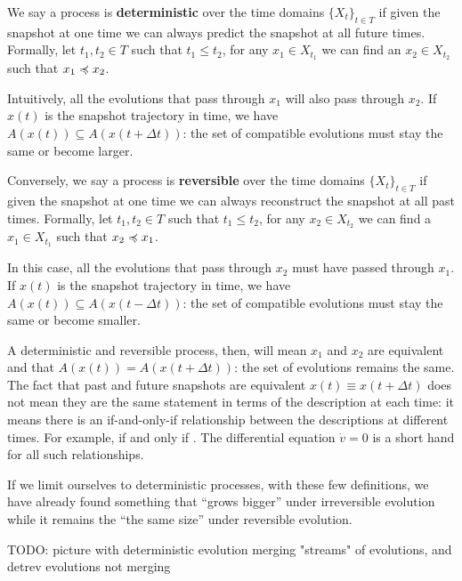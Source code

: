 \documentclass[letterpaper]{article}
\begin{document}
We say a process is \textbf{deterministic} over the time domains $\{X_t\}_{t \in T}$ if given the snapshot at one time we can always predict the snapshot at all future times. Formally, let $t_1, t_2 \in T$ such that $t_1 \leq t_2$, for any $x_1 \in X_{t_1}$ we can find an $x_2 \in X_{t_2}$ such that $x_1 \preccurlyeq x_2$.

Intuitively, all the evolutions that pass through $x_1$ will also pass through $x_2$. If $x(t)$ is the snapshot trajectory in time, we have $A(x(t)) \subseteq A(x(t + \Delta t))$: the set of compatible evolutions must stay the same or become larger.

Conversely, we say a process is \textbf{reversible} over the time domains $\{X_t\}_{t \in T}$ if given the snapshot at one time we can always reconstruct the snapshot at all past times. Formally, let $t_1, t_2 \in T$ such that $t_1 \leq t_2$, for any $x_2 \in X_{t_2}$ we can find a $x_1 \in X_{t_1}$ such that $x_2 \preccurlyeq x_1$.

In this case, all the evolutions that pass through $x_2$ must have passed through $x_1$. If $x(t)$ is the snapshot trajectory in time, we have $A(x(t)) \subseteq A(x(t - \Delta t))$: the set of compatible evolutions must stay the same or become smaller.

A deterministic and reversible process, then, will mean $x_1$ and $x_2$ are equivalent and that  $A(x(t)) = A(x(t + \Delta t))$: the set of evolutions remains the same. The fact that past and future snapshots are equivalent $x(t) \equiv x(t + \Delta t)$ does not mean they are the same statement in terms of the description at each time: it means there is an if-and-only-if relationship between the descriptions at different times. For example,  if and only if . The differential equation $\dot{v} = 0$ is a short hand for all such relationships.

If we limit ourselves to deterministic processes, with these few definitions, we have already found something that ``grows bigger'' under irreversible evolution while it remains the ``the same size'' under reversible evolution.

TODO: picture with deterministic evolution merging "streams" of evolutions, and detrev evolutions not merging
\end{document}
